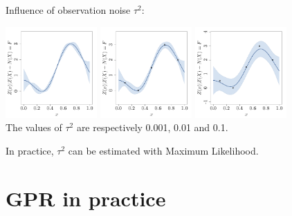 \documentclass{beamer}
\begin{document}
\begin{frame}{}
Influence of observation noise $\tau^2$:
\begin{center}
\includegraphics[height=3.5cm]{figures/R/ch34_GPRnoise0001} 
\includegraphics[height=3.5cm]{figures/R/ch34_GPRnoise001} 
\includegraphics[height=3.5cm]{figures/R/ch34_GPRnoise01}\\
The values of $\tau^2$ are respectively 0.001, 0.01 and 0.1.
\end{center}
In practice, $\tau^2$ can be estimated with Maximum Likelihood. 
\end{frame}

\section{GPR in practice}
\subsection{}
\end{document}
